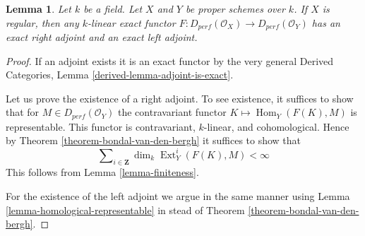 \documentclass{stacks-project}
\theoremstyle{plain}
\newtheorem{lemma}[subsection]{Lemma}
\theoremstyle{definition}
\theoremstyle{remark}
\numberwithin{equation}{subsection}
\def\Hom{\mathop{\mathrm{Hom}}\nolimits}
\def\Ext{\mathop{\mathrm{Ext}}\nolimits}
\begin{document}
\begin{lemma}
\label{lemma-always-right-adjoints}
Let $k$ be a field. Let $X$ and $Y$ be proper schemes over $k$.
If $X$ is regular, then any $k$-linear exact functor
$F : D_{perf}(\mathcal{O}_X) \to D_{perf}(\mathcal{O}_Y)$
has an exact right adjoint and an exact left adjoint.
\end{lemma}

\begin{proof}
If an adjoint exists it is an exact functor by the very general
Derived Categories, Lemma \ref{derived-lemma-adjoint-is-exact}.

\medskip\noindent
Let us prove the existence of a right adjoint.
To see existence, it suffices to show that for
$M \in D_{perf}(\mathcal{O}_Y)$ the contravariant functor
$K \mapsto \Hom_Y(F(K), M)$ is representable.
This functor is contravariant, $k$-linear, and cohomological.
Hence by Theorem \ref{theorem-bondal-van-den-bergh}
it suffices to show that
$$
\sum\nolimits_{i \in \mathbf{Z}} \dim_k \Ext^i_Y(F(K), M) < \infty
$$
This follows from Lemma \ref{lemma-finiteness}.

\medskip\noindent
For the existence of the left adjoint we argue in the same
manner using Lemma \ref{lemma-homological-representable}
in stead of Theorem \ref{theorem-bondal-van-den-bergh}.
\end{proof}
\end{document}
